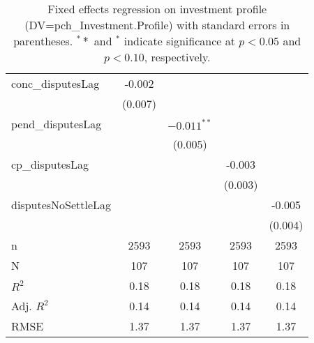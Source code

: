 \begin{table}[ht]
\begin{tabular}{lcccc}
  conc\_disputesLag & -0.002 &  &  &  \\ 
   & (0.007) &  &  &  \\ 
  pend\_disputesLag &  & $-0.011^{\ast\ast}$ &  &  \\ 
   &  & (0.005) &  &  \\ 
  cp\_disputesLag &  &  & -0.003 &  \\ 
   &  &  & (0.003) &  \\ 
  disputesNoSettleLag &  &  &  & -0.005 \\ 
   &  &  &  & (0.004) \\ 
   \hline
n & 2593 & 2593 & 2593 & 2593 \\ 
  N & 107 & 107 & 107 & 107 \\ 
  $R^{2}$ & 0.18 & 0.18 & 0.18 & 0.18 \\ 
  Adj. $R^{2}$ & 0.14 & 0.14 & 0.14 & 0.14 \\ 
  RMSE & 1.37 & 1.37 & 1.37 & 1.37 \\ 
   \hline
\hline
\end{tabular}
\caption{Fixed effects regression on investment profile (DV=pch\_Investment.Profile) with standard errors in parentheses. $^**$ and $^*$ indicate significance at $p< 0.05 $ and $p< 0.10 $, respectively.} 
\end{table}
